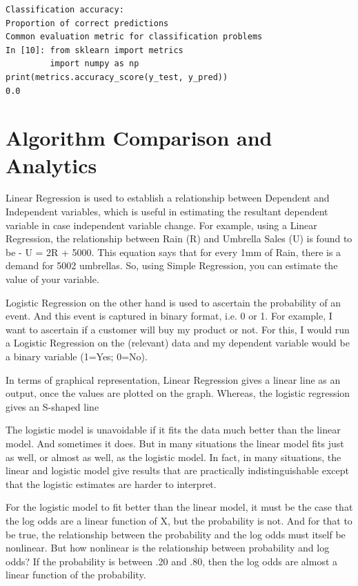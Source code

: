 \documentclass[sigconf]{acmart}
\begin{document}
\begin{lstlisting}
Classification accuracy: 
Proportion of correct predictions
Common evaluation metric for classification problems
In [10]: from sklearn import metrics
         import numpy as np
print(metrics.accuracy_score(y_test, y_pred))
0.0
\end{lstlisting}

\section{Algorithm Comparison and Analytics}
\par 
Linear Regression is used to establish a relationship between Dependent and Independent variables, which is useful in estimating the resultant dependent variable in case independent variable change. For example, using a Linear Regression, the relationship between Rain (R) and Umbrella Sales (U) is found to be - U = 2R + 5000. This equation says that for every 1mm of Rain, there is a demand for 5002 umbrellas. So, using Simple Regression, you can estimate the value of your variable.

\par 
Logistic Regression on the other hand is used to ascertain the probability of an event. And this event is captured in binary format, i.e. 0 or 1. For example, I want to ascertain if a customer will buy my product or not. For this, I would run a Logistic Regression on the (relevant) data and my dependent variable would be a binary variable (1=Yes; 0=No).

\par
In terms of graphical representation, Linear Regression gives a linear line as an output, once the values are plotted on the graph. Whereas, the logistic regression gives an S-shaped line

\par
The logistic model is unavoidable if it fits the data much better than the linear model. And sometimes it does. But in many situations the linear model fits just as well, or almost as well, as the logistic model. In fact, in many situations, the linear and logistic model give results that are practically indistinguishable except that the logistic estimates are harder to interpret.
\par
For the logistic model to fit better than the linear model, it must be the case that the log odds are a linear function of X, but the probability is not. And for that to be true, the relationship between the probability and the log odds must itself be nonlinear. But how nonlinear is the relationship between probability and log odds? If the probability is between .20 and .80, then the log odds are almost a linear function of the probability.
\end{document}
